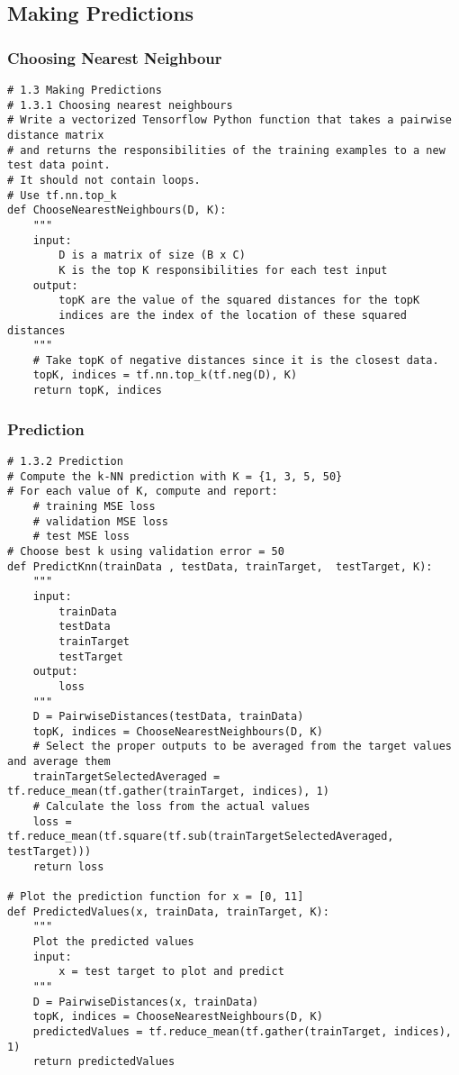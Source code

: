 \documentclass[a4paper,12pt]{article}
\begin{document}
\subsection{Making Predictions}
\subsubsection{Choosing Nearest Neighbour}
\begin{verbatim}
# 1.3 Making Predictions
# 1.3.1 Choosing nearest neighbours
# Write a vectorized Tensorflow Python function that takes a pairwise distance matrix
# and returns the responsibilities of the training examples to a new test data point. 
# It should not contain loops.
# Use tf.nn.top_k
def ChooseNearestNeighbours(D, K):
    """
    input:
        D is a matrix of size (B x C)
        K is the top K responsibilities for each test input
    output:
        topK are the value of the squared distances for the topK
        indices are the index of the location of these squared distances
    """
    # Take topK of negative distances since it is the closest data.
    topK, indices = tf.nn.top_k(tf.neg(D), K)
    return topK, indices
\end{verbatim}
\subsubsection{Prediction}
\begin{verbatim}
# 1.3.2 Prediction
# Compute the k-NN prediction with K = {1, 3, 5, 50}
# For each value of K, compute and report:
    # training MSE loss
    # validation MSE loss
    # test MSE loss
# Choose best k using validation error = 50
def PredictKnn(trainData , testData, trainTarget,  testTarget, K):
    """
    input:
        trainData
        testData
        trainTarget
        testTarget
    output:
        loss
    """
    D = PairwiseDistances(testData, trainData)
    topK, indices = ChooseNearestNeighbours(D, K)
    # Select the proper outputs to be averaged from the target values and average them
    trainTargetSelectedAveraged = tf.reduce_mean(tf.gather(trainTarget, indices), 1)
    # Calculate the loss from the actual values
    loss = tf.reduce_mean(tf.square(tf.sub(trainTargetSelectedAveraged, testTarget)))
    return loss

# Plot the prediction function for x = [0, 11]
def PredictedValues(x, trainData, trainTarget, K):
    """
    Plot the predicted values
    input:
        x = test target to plot and predict
    """
    D = PairwiseDistances(x, trainData)
    topK, indices = ChooseNearestNeighbours(D, K)
    predictedValues = tf.reduce_mean(tf.gather(trainTarget, indices), 1)
    return predictedValues
\end{verbatim}
\end{document}
